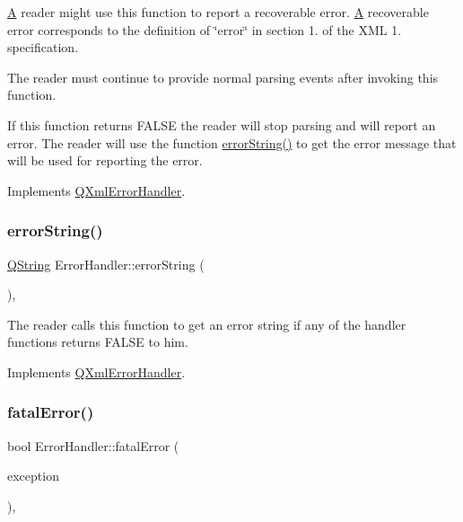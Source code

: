 \mbox{\hyperlink{class_a}{A}} reader might use this function to report a recoverable error. \mbox{\hyperlink{class_a}{A}} recoverable error corresponds to the definition of \char`\"{}error\char`\"{} in section 1. of the X\+ML 1. specification.

The reader must continue to provide normal parsing events after invoking this function.

If this function returns F\+A\+L\+SE the reader will stop parsing and will report an error. The reader will use the function \mbox{\hyperlink{class_error_handler_a193381152001d019c4155600a61c478d}{error\+String()}} to get the error message that will be used for reporting the error. 

Implements \mbox{\hyperlink{class_q_xml_error_handler_aa7e25c4198fa16a0312fd48e5718217c}{Q\+Xml\+Error\+Handler}}.

\mbox{\label{class_error_handler_a193381152001d019c4155600a61c478d}} 
\subsubsection{\texorpdfstring{errorString()}{errorString()}}
{\footnotesize\ttfamily \mbox{\hyperlink{class_q_string}{Q\+String}} Error\+Handler\+::error\+String (\begin{DoxyParamCaption}{ }\end{DoxyParamCaption})\hspace{0.3cm}{\ttfamily [inline]}, {\ttfamily [virtual]}}

The reader calls this function to get an error string if any of the handler functions returns F\+A\+L\+SE to him. 

Implements \mbox{\hyperlink{class_q_xml_error_handler_a7b265803d41782e6207b497fe09beff0}{Q\+Xml\+Error\+Handler}}.

\mbox{\label{class_error_handler_abb20bb96f3b3b743e1d5649d6c6be5a0}} 
\subsubsection{\texorpdfstring{fatalError()}{fatalError()}}
{\footnotesize\ttfamily bool Error\+Handler\+::fatal\+Error (\begin{DoxyParamCaption}\item[{const \mbox{\hyperlink{class_q_xml_parse_exception}{Q\+Xml\+Parse\+Exception}} \&}]{exception }\end{DoxyParamCaption})\hspace{0.3cm}{\ttfamily [inline]}, {\ttfamily [virtual]}}

